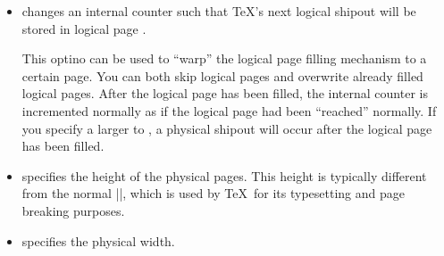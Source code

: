 \begin{command}{\pgfpageoptions{}}
\begin{itemize}
    Note that logical pages that lie outside the interval between
     and  are filled only indirectly or when
    special commands are used.

    By default,  equals .
  \item {} changes
    an internal counter such that \TeX's next logical shipout will be
    stored in logical page .

    This optino can be used to ``warp'' the logical page filling
    mechanism to a certain page. You can both skip logical pages and
    overwrite already filled logical pages. After the logical page
     has been filled, the internal counter is
    incremented normally as if the logical page  had
    been ``reached'' normally. If you specify a  larger
    to , a physical shipout will occur after the logical
    page  has been filled.
  \item
    specifies the height of the physical pages. This height is
    typically different from the normal  |\paperheight|, which is used
    by \TeX\ for its typesetting and page breaking purposes.
  \item
    specifies the physical width.
  \end{itemize}
\end{command}


